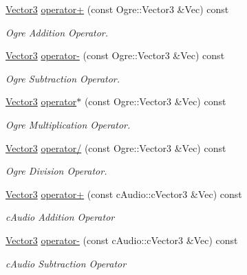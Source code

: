 \begin{DoxyCompactItemize}
\hyperlink{classphys_1_1Vector3}{Vector3} \hyperlink{classphys_1_1Vector3_a9d08649625ad4d5a7e8665c1234168b9}{operator+} (const Ogre::Vector3 \&Vec) const 
\begin{DoxyCompactList}\small\item\em Ogre Addition Operator. \item\end{DoxyCompactList}\item 
\hyperlink{classphys_1_1Vector3}{Vector3} \hyperlink{classphys_1_1Vector3_a1110bc38c3cb60f97c3946d13917401b}{operator-\/} (const Ogre::Vector3 \&Vec) const 
\begin{DoxyCompactList}\small\item\em Ogre Subtraction Operator. \item\end{DoxyCompactList}\item 
\hyperlink{classphys_1_1Vector3}{Vector3} \hyperlink{classphys_1_1Vector3_ae28e8373fb05d55edbde46eda64c431a}{operator$\ast$} (const Ogre::Vector3 \&Vec) const 
\begin{DoxyCompactList}\small\item\em Ogre Multiplication Operator. \item\end{DoxyCompactList}\item 
\hyperlink{classphys_1_1Vector3}{Vector3} \hyperlink{classphys_1_1Vector3_afadb345e180a9be607ec33de68c7a71b}{operator/} (const Ogre::Vector3 \&Vec) const 
\begin{DoxyCompactList}\small\item\em Ogre Division Operator. \item\end{DoxyCompactList}\item 
\hyperlink{classphys_1_1Vector3}{Vector3} \hyperlink{classphys_1_1Vector3_aef08d2451bb4959e02f1b09067284b5c}{operator+} (const cAudio::cVector3 \&Vec) const 
\begin{DoxyCompactList}\small\item\em cAudio Addition Operator \item\end{DoxyCompactList}\item 
\hyperlink{classphys_1_1Vector3}{Vector3} \hyperlink{classphys_1_1Vector3_a84bcf6d8e0c850e32c642f1b634d38e9}{operator-\/} (const cAudio::cVector3 \&Vec) const 
\begin{DoxyCompactList}\small\item\em cAudio Subtraction Operator \item\end{DoxyCompactList}\item 

\end{DoxyCompactItemize}
